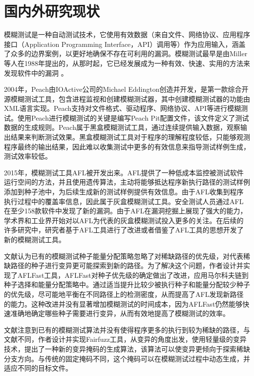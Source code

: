 \documentclass[master]{thesis-uestc}
\begin{document}
\section{国内外研究现状}
模糊测试是一种自动测试技术，它使用有效数据（来自文件、网络协议、应用程序接口（Application Programming Interface，API）调用等）作为应用输入，涵盖了众多的边界案例，以更好地确保不存在可利用的漏洞。模糊测试最早是由Miller等人在1988年提出的，从那时起，它已经发展成为一种有效、快速、实用的方法来发现软件中的漏洞 。

2004年，Peach由IOActive公司的Michael Eddington创造并开发，是第一款综合开源模糊测试工具，包含进程监视和创建模糊测试器，其中创建模糊测试器的功能由XML语言实现。Peach支持对文件格式、驱动程序、网络协议、API等进行模糊测试。使用Peach进行模糊测试的关键是编写Peach Pit配置文件，该文件定义了测试数据的生成规则。Peach属于黑盒模糊测试工具，通过连续提供输入数据，观察输出结果来判断测试效果。黑盒模糊测试工具对于程序的理解程度较低，只能够观测程序最终的输出结果，因此难以收集测试中更多的有效信息来指导测试样例生成，测试效率较低。

2015年，模糊测试工具AFL被开发出来。AFL提供了一种低成本监控被测试软件运行空间的方法，并且使用遗传算法，主动将能够抵达程序新执行路径的测试样例添加到种子池中，为后续生成新的测试样例提供有效信息。由于AFL收集到程序执行过程中的覆盖率信息，因此属于灰盒模糊测试工具。安全测试人员通过AFL在至少158款软件中发现了新的漏洞。由于AFL在漏洞挖掘上展现了强大的能力，学术界和工业界开始对以AFL为代表的灰盒模糊测试投入更多的关注。在后续的许多研究中，研究者基于AFL工具进行了改进或者借鉴了AFL工具的思想开发了新的模糊测试工具。

文献\cite{bohme2017coverage}认为已有的模糊测试种子能量分配策略忽略了对稀缺路径的优先级，对代表稀缺路径的种子进行变异更可能探索到新的路径。为了解决这个问题，作者设计并实现了AFLFast工具，AFLFast对种子优先级的确定做出了改进，应用马尔科夫链到种子选择和能量分配策略中。通过适当提升比较少被执行种子和能量分配较少种子的优先级，尽可能地平衡在不同路径上的检测密度，从而提高了AFL发现新路径的能力。这种改进并没有显著增加模糊测试的时间成本，因为AFLFast仍然能够快速准确地确定哪些种子需要进行变异，从而有效地提高了模糊测试的效率。

文献\cite{lemieux2018fairfuzz}注意到已有的模糊测试算法并没有使得程序更多的执行到较为稀缺的路径，与文献\cite{bohme2017coverage}不同，作者设计并实现Fairfuzz工具，从变异的角度出发，使用轻量级的变异技术，提出了一种新的变异掩码的生成算法，该算法可以使变异更倾向于探索稀缺分支方向。与传统的固定掩码不同，这个掩码可以在模糊测试过程中动态生成，并适应不同的目标文件。
\end{document}
